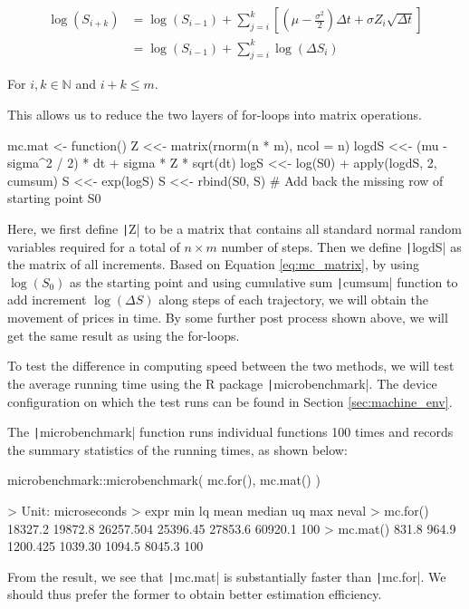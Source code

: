 \begin{align}
\log(S_{i+k}) &= \log(S_{i-1}) + \sum_{j=i}^{k}{\left[(\mu - \frac{\sigma^2}{2})\Delta t + \sigma Z_i \sqrt{\Delta t}\right]} \\
&= \log(S_{i-1}) + \sum_{j=i}^{k}{\log(\Delta S_i)} \label{eq:mc_matrix}
\end{align}

For $i,k\in\mathbb{N}$ and $i+k\leq m$.

This allows us to reduce the two layers of for-loops into matrix operations.

\begin{Rminted}
mc.mat <- function() {
    Z <<- matrix(rnorm(n * m), ncol = n)
    logdS <<- (mu - sigma^2 / 2) * dt + sigma * Z * sqrt(dt)
    logS <<- log(S0) + apply(logdS, 2, cumsum)
    S <<- exp(logS)
    S <<- rbind(S0, S) # Add back the missing row of starting point S0
}
\end{Rminted}

Here, we first define \texttt|Z| to be a matrix that contains all standard normal random variables required for a total of $n\times m$ number of steps. Then we define \texttt|logdS| as the matrix of all increments. Based on Equation \ref{eq:mc_matrix}, by using $\log(S_0)$ as the starting point and using cumulative sum \texttt|cumsum| function to add increment $\log(\Delta S)$ along steps of each trajectory, we will obtain the movement of prices in time. By some further post process shown above, we will get the same result as using the for-loops.

To test the difference in computing speed between the two methods, we will test the average running time using the R package \texttt|microbenchmark|. The device configuration on which the test runs can be found in Section \ref{sec:machine_env}.

The \texttt|microbenchmark| function runs individual functions 100 times and records the summary statistics of the running times, as shown below:

\begin{Rminted}
microbenchmark::microbenchmark(
    mc.for(),
    mc.mat()
)

>     Unit: microseconds
>     expr     min      lq      mean   median      uq     max neval
> mc.for() 18327.2 19872.8 26257.504 25396.45 27853.6 60920.1   100
> mc.mat()   831.8   964.9  1200.425  1039.30  1094.5  8045.3   100
\end{Rminted}

From the result, we see that \texttt|mc.mat| is substantially faster than \texttt|mc.for|. We should thus prefer the former to obtain better estimation efficiency.

